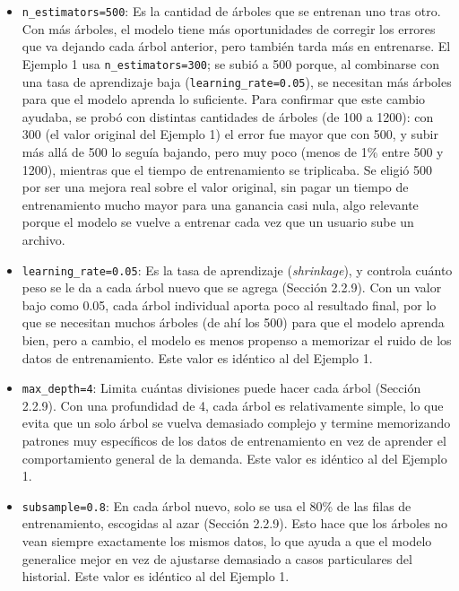 \begin{itemize}
    \item \texttt{n\_estimators=500}: Es la cantidad de árboles que se entrenan uno tras otro. Con más árboles, el modelo tiene más oportunidades de corregir los errores que va dejando cada árbol anterior, pero también tarda más en entrenarse. El Ejemplo 1 usa \texttt{n\_estimators=300}; se subió a 500 porque, al combinarse con una tasa de aprendizaje baja (\texttt{learning\_rate=0.05}), se necesitan más árboles para que el modelo aprenda lo suficiente. Para confirmar que este cambio ayudaba, se probó con distintas cantidades de árboles (de 100 a 1200): con 300 (el valor original del Ejemplo 1) el error fue mayor que con 500, y subir más allá de 500 lo seguía bajando, pero muy poco (menos de 1\% entre 500 y 1200), mientras que el tiempo de entrenamiento se triplicaba. Se eligió 500 por ser una mejora real sobre el valor original, sin pagar un tiempo de entrenamiento mucho mayor para una ganancia casi nula, algo relevante porque el modelo se vuelve a entrenar cada vez que un usuario sube un archivo.

    \item \texttt{learning\_rate=0.05}: Es la tasa de aprendizaje (\textit{shrinkage}), y controla cuánto peso se le da a cada árbol nuevo que se agrega (Sección 2.2.9). Con un valor bajo como 0.05, cada árbol individual aporta poco al resultado final, por lo que se necesitan muchos árboles (de ahí los 500) para que el modelo aprenda bien, pero a cambio, el modelo es menos propenso a memorizar el ruido de los datos de entrenamiento. Este valor es idéntico al del Ejemplo 1.

    \item \texttt{max\_depth=4}: Limita cuántas divisiones puede hacer cada árbol (Sección 2.2.9). Con una profundidad de 4, cada árbol es relativamente simple, lo que evita que un solo árbol se vuelva demasiado complejo y termine memorizando patrones muy específicos de los datos de entrenamiento en vez de aprender el comportamiento general de la demanda. Este valor es idéntico al del Ejemplo 1.

    \item \texttt{subsample=0.8}: En cada árbol nuevo, solo se usa el 80\% de las filas de entrenamiento, escogidas al azar (Sección 2.2.9). Esto hace que los árboles no vean siempre exactamente los mismos datos, lo que ayuda a que el modelo generalice mejor en vez de ajustarse demasiado a casos particulares del historial. Este valor es idéntico al del Ejemplo 1.


\end{itemize}

